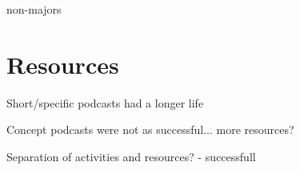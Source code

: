 \citet{Guzdial:2005} non-majors


\section{Resources} %
\label{sec:resources}

Short/specific podcasts had a longer life

Concept podcasts were not as successful... more resources?

Separation of activities and resources? - successfull






